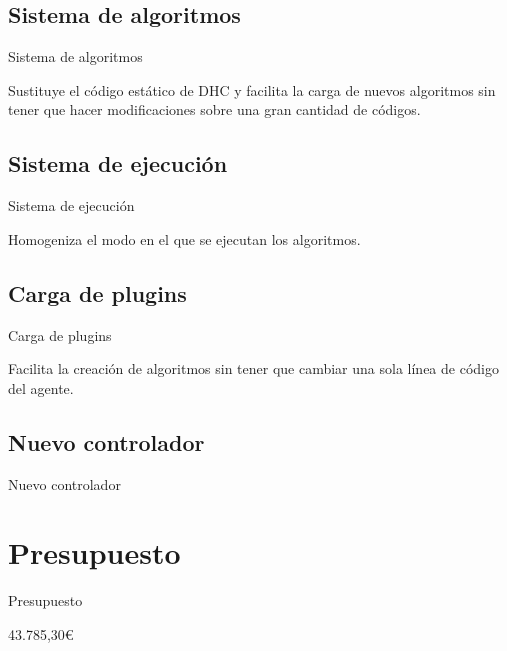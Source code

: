 \documentclass[12pt,hyperref={pdfpagelabels=false}]{beamer}
\begin{document}
\subsection{Sistema de algoritmos}
\begin{frame}{Sistema de algoritmos}
	\begin{center}
		Sustituye el código estático de DHC y facilita la carga de nuevos algoritmos sin tener que hacer modificaciones sobre una gran cantidad de códigos.
	\end{center}
\end{frame}

\subsection{Sistema de ejecución}
\begin{frame}{Sistema de ejecución}
	\begin{center}
		Homogeniza el modo en el que se ejecutan los algoritmos.
	\end{center}
\end{frame}

\subsection{Carga de plugins}
\begin{frame}{Carga de plugins}
	\begin{center}
		Facilita la creación de algoritmos sin tener que cambiar una sola línea de código del agente.
	\end{center}
\end{frame}

\subsection{Nuevo controlador}
\begin{frame}{Nuevo controlador}

\end{frame}



\section{Presupuesto}
\begin{frame}{Presupuesto}
	\begin{center}
		43.785,30\euro
	\end{center}
\end{frame}
\end{document}
